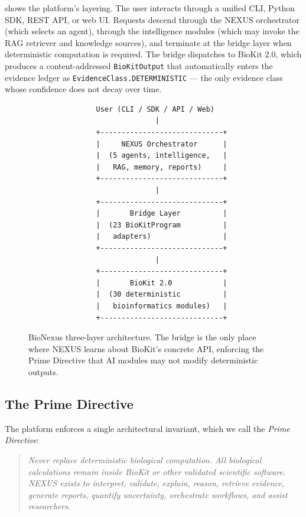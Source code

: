 \documentclass[11pt,a4paper]{article}
\begin{document}
 shows the platform's layering. The user interacts
through a unified CLI, Python SDK, REST API, or web UI. Requests descend
through the NEXUS orchestrator (which selects an agent), through the
intelligence modules (which may invoke the RAG retriever and knowledge
sources), and terminate at the bridge layer when deterministic computation
is required. The bridge dispatches to BioKit 2.0, which produces a
content-addressed \texttt{BioKitOutput} that automatically enters the
evidence ledger as \texttt{EvidenceClass.DETERMINISTIC} --- the only
evidence class whose confidence does not decay over time.

\begin{figure}[t]
\centering
\begin{verbatim}
                User (CLI / SDK / API / Web)
                              |
                +-----------------------------+
                |     NEXUS Orchestrator      |
                |  (5 agents, intelligence,   |
                |   RAG, memory, reports)     |
                +-----------------------------+
                              |
                +-----------------------------+
                |       Bridge Layer          |
                |  (23 BioKitProgram          |
                |   adapters)                 |
                +-----------------------------+
                              |
                +-----------------------------+
                |       BioKit 2.0            |
                |  (30 deterministic          |
                |   bioinformatics modules)   |
                +-----------------------------+
\end{verbatim}
\caption{BioNexus three-layer architecture. The bridge is the only place
where NEXUS learns about BioKit's concrete API, enforcing the Prime
Directive that AI modules may not modify deterministic outputs.}
\label{fig:architecture}
\end{figure}

\subsection{The Prime Directive}

The platform enforces a single architectural invariant, which we call the
\emph{Prime Directive}:

\begin{quote}
\textit{Never replace deterministic biological computation. All biological
calculations remain inside BioKit or other validated scientific software.
NEXUS exists to interpret, validate, explain, reason, retrieve evidence,
generate reports, quantify uncertainty, orchestrate workflows, and assist
researchers.}
\end{quote}
\end{document}
